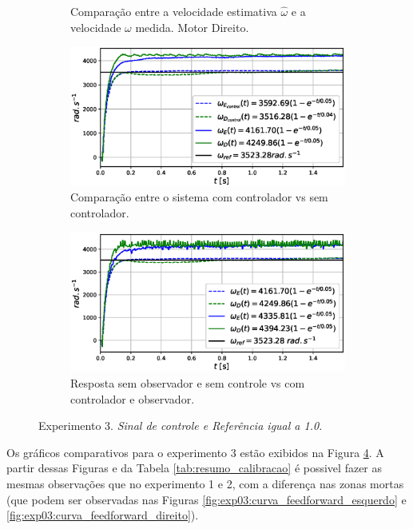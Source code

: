 \begin{figure}[H]
\begin{subfigure}{.5\textwidth}
    \caption{Comparação entre a velocidade estimativa $\hat{\omega}$ e a velocidade $\omega$ medida. Motor Direito.}
    \label{fig:exp03:filtragem_direito}
    \end{subfigure}
    \hfill
    \begin{subfigure}{.5\textwidth}
    \centering
    \includegraphics[width=\textwidth]{figuras/resultados/exp03/controlador_vs_sem_controlador100.eps}
    \caption{Comparação entre o sistema com controlador vs sem controlador.}
    \label{fig:exp03:controle}
    \end{subfigure}
    \hfill
    \begin{subfigure}{.5\textwidth}
    \centering
    \includegraphics[width=\textwidth]{figuras/resultados/exp03/antes_vs_depois100.eps}
    \caption{Resposta sem observador e sem controle vs com controlador e observador.}
    \label{fig:exp03:antes_vs_depois}
    \end{subfigure}
    
    \caption{Experimento 3. \emph{Sinal de controle e Referência igual a 1.0.}}
    \label{fig:exp03_100}
\end{figure}

Os gráficos comparativos para o experimento 3 estão exibidos na Figura \ref{fig:exp03_100}. A partir dessas Figuras e da Tabela \ref{tab:resumo_calibracao} é possivel fazer as mesmas observações que no experimento 1 e 2, com a diferença nas zonas mortas (que podem ser observadas nas Figuras \ref{fig:exp03:curva_feedforward_esquerdo} e \ref{fig:exp03:curva_feedforward_direito}).


